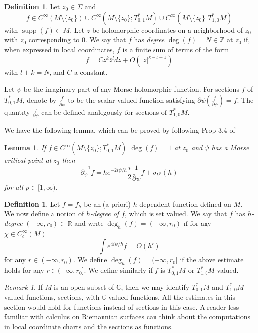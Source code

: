 \documentclass[12pt]{amsart}
\DeclareMathOperator{\supp}{supp}
\def\C{\mathbb C}
\def\R{\mathbb R}
\newtheorem{lemma}[theorem]{Lemma}
\theoremstyle{definition}
\newtheorem{definition}[theorem]{Definition}
\theoremstyle{remark}
\newtheorem{remark}[theorem]{Remark}
\newcommand{\abs}[1]{\lvert #1 \rvert}
\newcommand{\tbl}[1]{\textcolor{blue}{#1}}
\newcommand{\f}[1]{\footnote{\tbl{#1}}}
\begin{document}
\begin{definition}
 Let $z_0\in \Sigma$ and 
 $$f\in C^\infty(M\setminus \{z_0\}) \cup  C^\infty(M\setminus \{z_0\}; T^*_{0,1}M)\cup  C^\infty(M\setminus \{z_0\}; T^*_{1,0}M)$$
 with $\supp (f) \subset M$. Let $z$ be holomorphic coordinates on a neighborhood of $z_0$ with $z_0$ corresponding to $0$. We say that $f$ has \emph{degree} $\deg(f) = N \in \mathbb Z$ at $z_0$ if, when expressed in local coordinates, $f$ is a finite sum of terms of the form
 \[ f = 
  Cz^k\overline z^l dz+ O(\abs{z}^{k+l+1})
 \]
with $l + k = N$, and $C$ a constant.
\end{definition}
 
Let $\psi$ be the imaginary part of any Morse holomorphic function. For sections $f$ of $T^*_{0,1}M$, denote by $\frac{f}{\bar\partial \psi}$ to be the scalar valued function satisfying $\bar\partial \psi \left (\frac{f}{\bar\partial \psi}\right) = f$. The quantity $\frac{f}{\partial \psi}$ can be defined analogously for sections of $T^*_{1,0}M$.

We have the following lemma, which can be proved by following Prop 3.4 of \cite{imanuvilov2012partial}
\begin{lemma}
\label{lem: iuy modified}
If $f\in  C^\infty(M\setminus \{z_0\}; T^*_{0,1}M)$  $\deg(f) = 1$ at $z_0$ and $\psi$ has a Morse critical point at $z_0$ then
$$\bar\partial_\psi^{-1} f = he^{-2i\psi/h} \frac{i}{2} \frac{1}{\bar\partial\psi} f + o_{L^p}(h)$$
for all $p\in[1,\infty)$. 
\end{lemma}


\begin{definition}
Let $f=f_h$ be an (a priori) $h$-dependent function defined on $M$. We now define a notion of \emph{$h$-degree of $f$}, which is set valued. We say that $f$ has \emph{$h$-degree} $(-\infty, r_0)\subset \R$ and write $\deg_h(f) = (-\infty, r_0)$  if for any $\chi \in C_c^\infty(M)$
 \[
  \int e^{4i\psi/h} f=O(h^r)
 \]
 for any $r\in (-\infty, r_0)$. We define $\deg_h(f) = (-\infty, r_0]$ if the above estimate holds for
any $r\in (-\infty, r_0]$. We define similarly if $f$ is $T_{0,1}^*M$ or $T_{1,0}^*M$ valued.

\end{definition}

\begin{remark}
If $M$ is an open subset of $\mathbb C$, then we may identify $T^*_{0,1}M$ and $T^*_{1,0}M$ valued functions, sections, with $\C$-valued functions.  All the estimates in this section would hold for functions instead of sections in this case. A reader less familiar with calculus on Riemannian surfaces can think about the computations in local coordinate charts and the sections as functions.
% 
% 
\end{remark}
\end{document}
